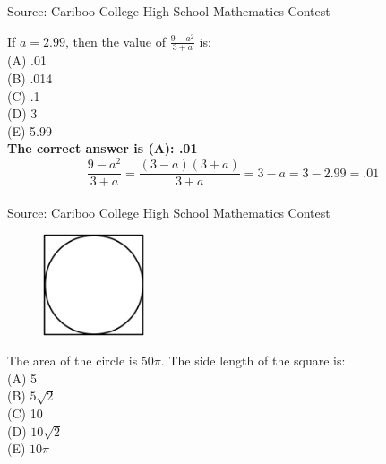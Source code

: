 \documentclass{article}
\begin{document}
\parindent=0cm
\parskip=6pt
\pagestyle{empty}


\scriptsize
Source: Cariboo College High School Mathematics Contest

\normalsize
If $a=2.99$, then the value of $\frac{9-a^{2}}{3+a}$ is:\\
(A) .01\\
(B) .014\\
(C) .1\\
(D) 3\\
(E) 5.99\\


\textbf{The correct answer is (A): .01}\\[1 ex]
\begin{equation*}
\frac{9-a^{2}}{3+a}=\frac{(3-a)(3+a)}{3+a}=3-a=3-2.99=.01
\end{equation*}
\\[5 ex]

\scriptsize
Source: Cariboo College High School Mathematics Contest

\normalsize
\begin{figure}
	\includegraphics[width=30mm,viewport=47 157 506 618]{CCSPR74-2pic.eps}
\end{figure}
The area of the circle is $50\pi$. The side length of the square is:\\
(A) 5\\
(B) $5\sqrt{2}$\\
(C) 10\\
(D) $10\sqrt{2}$\\
(E) $10\pi$\\
\end{document}
